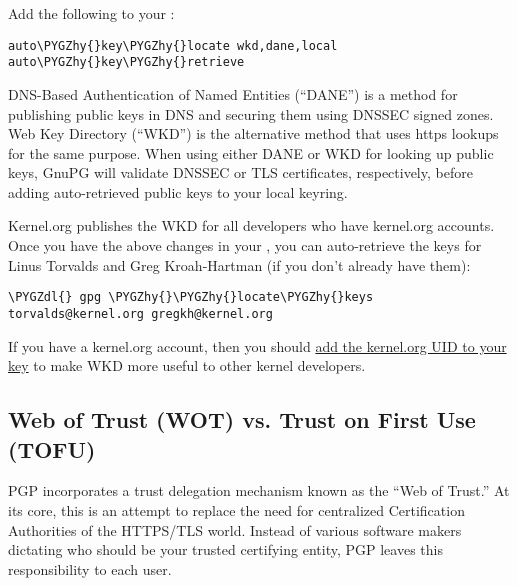 \documentclass[a4paper,8pt,english]{sphinxmanual}
\def\PYGZdl{\char`\$}
\def\PYGZhy{\char`\-}
\begin{document}
Add the following to your :

\begin{Verbatim}[commandchars=\\\{\}]
auto\PYGZhy{}key\PYGZhy{}locate wkd,dane,local
auto\PYGZhy{}key\PYGZhy{}retrieve
\end{Verbatim}

DNS-Based Authentication of Named Entities (``DANE'') is a method for
publishing public keys in DNS and securing them using DNSSEC signed
zones. Web Key Directory (``WKD'') is the alternative method that uses
https lookups for the same purpose. When using either DANE or WKD for
looking up public keys, GnuPG will validate DNSSEC or TLS certificates,
respectively, before adding auto-retrieved public keys to your local
keyring.

Kernel.org publishes the WKD for all developers who have kernel.org
accounts. Once you have the above changes in your , you can
auto-retrieve the keys for Linus Torvalds and Greg Kroah-Hartman (if you
don't already have them):

\begin{Verbatim}[commandchars=\\\{\}]
\PYGZdl{} gpg \PYGZhy{}\PYGZhy{}locate\PYGZhy{}keys torvalds@kernel.org gregkh@kernel.org
\end{Verbatim}

If you have a kernel.org account, then you should \href{https://korg.wiki.kernel.org/userdoc/mail\#adding\_a\_kernelorg\_uid\_to\_your\_pgp\_key}{add the kernel.org
UID to your key} to make WKD more useful to other kernel developers.


\subsection{Web of Trust (WOT) vs. Trust on First Use (TOFU)}
\label{process/maintainer-pgp-guide:web-of-trust-wot-vs-trust-on-first-use-tofu}\label{process/maintainer-pgp-guide:add-the-kernel-org-uid-to-your-key}
PGP incorporates a trust delegation mechanism known as the ``Web of
Trust.'' At its core, this is an attempt to replace the need for
centralized Certification Authorities of the HTTPS/TLS world. Instead of
various software makers dictating who should be your trusted certifying
entity, PGP leaves this responsibility to each user.
\end{document}
